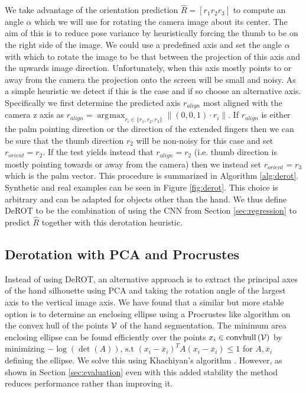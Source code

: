\documentclass{bmvc2k}
\DeclareMathOperator*{\argmax}{\arg\!\max}
\begin{document}

We take advantage of the orientation prediction $\hat{R}=\left[r_1 r_2 r_3\right]$ to compute an angle $\alpha$ which we will use for rotating the camera image about its center. The aim of this is to reduce pose variance by heuristically forcing the thumb to be on the right side of the image. We could use a predefined axis and set the angle $\alpha$ with which to rotate the image to be that between the projection of this axis and the upwards image direction. Unfortunately, when this axis mostly points to or away from the camera the projection onto the screen will be small and noisy. As a simple heuristic we detect if this is the case and if so choose an alternative axis. Specifically we first determine the predicted axis $r_{align}$ most aligned with the camera z axis as $r_{align}=\argmax_{r_i \in \{r_1,r_2,r_3\}} \|\left(0,0,1\right)\cdot r_i\|$. If $r_{align}$ is either the palm pointing direction or the direction of the extended fingers then we can be sure that the thumb direction $r_2$ will be non-noisy for this case and set $r_{orient}=r_2$. If the test yields instead that $r_{align}=r_2$ (i.e. thumb direction is mostly pointing towards or away from the camera) then we instead set $r_{orient}=r_3$ which is the palm vector. This procedure is summarized in Algorithm \ref{alg:derot}. Synthetic and real examples can be seen in Figure \ref{fig:derot}. This choice is arbitrary and can be adapted for objects other than the hand. We thus define DeROT to be the combination of using the CNN from Section \ref{sec:regression} to predict $\hat{R}$ together with this derotation heuristic. 


\subsection{Derotation with PCA and Procrustes} \label{sec:pca}
Instead of using DeROT, an alternative approach is to extract the principal axes of the hand silhouette using PCA and taking the rotation angle of the largest axis to the vertical image axis. We have found that a similar but more stable option is to determine an enclosing ellipse using a Procrustes like algorithm on the convex hull of the points $\cal V$ of the hand segmentation. The minimum area enclosing ellipse can be found efficiently over the points $x_i\in\text{convhull}\left({\cal V}\right)$ by minimizing $-\log \left( {\det \left( A \right)} \right) \text{,  s.t  } {\left( {{x_i} - {\overline x_i}} \right)^T}A\left( {{x_i} - {\overline x_i}} \right)\leq 1$ for $A,{\overline x_i}$ defining the ellipse. We solve this using Khachiyan's algorithm \cite{AspvallS80}. However, as shown in Section \ref{sec:evaluation} even with this added stability the method reduces performance rather than improving it. 
 
\end{document}
